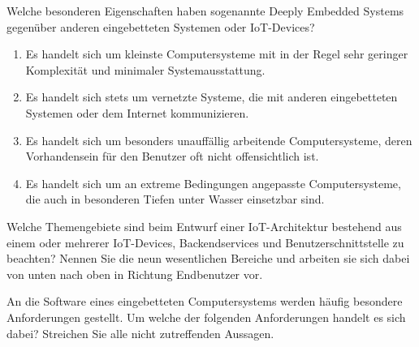 \teilaufgabe
Welche besonderen Eigenschaften haben sogenannte \glqq Deeply Embedded Systems\grqq{}
gegenüber anderen eingebetteten Systemen oder IoT-Devices?

\begin{enumerate}
    \item Es handelt sich um kleinste Computersysteme mit in der Regel sehr
    geringer Komplexität und minimaler Systemausstattung.

    \item Es handelt sich stets um vernetzte Systeme, die mit anderen eingebetteten
    Systemen oder dem Internet kommunizieren.

    \item Es handelt sich um besonders unauffällig arbeitende Computersysteme,
    deren Vorhandensein für den Benutzer oft nicht offensichtlich ist.

    \item Es handelt sich um an extreme Bedingungen angepasste Computersysteme,
    die auch in besonderen Tiefen unter Wasser einsetzbar sind.
\end{enumerate}

\teilaufgabe
Welche Themengebiete sind beim Entwurf einer IoT-Architektur bestehend aus einem
oder mehrerer IoT-Devices, Backendservices und Benutzerschnittstelle zu beachten?
Nennen Sie die neun wesentlichen Bereiche und arbeiten sie sich dabei von unten
nach oben in Richtung Endbenutzer vor.

\bigskip
\teilaufgabe
An die Software eines eingebetteten Computersystems werden häufig besondere
Anforderungen gestellt. Um welche der folgenden Anforderungen handelt es sich
dabei? Streichen Sie alle nicht zutreffenden Aussagen.

